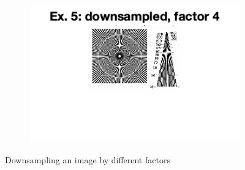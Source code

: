 \documentclass{article}
\begin{document}
\begin{figure}
\begin{subfigure}[c]{0.3\textwidth}
    \end{subfigure}
    \hfill
    \begin{subfigure}[c]{0.3\textwidth}
        \includegraphics[width=\textwidth]{images/ex5_4.png}
    \end{subfigure}
    \caption{Downsampling an image by different factors}
    \label{fig:resample}
\end{figure}
\end{document}

